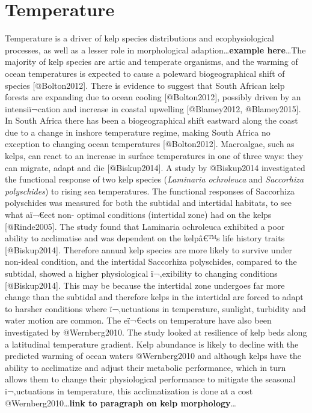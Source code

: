 \documentclass[]{article}
\newcommand{\euro}{€}
\begin{document}
\section{Temperature}\label{temperature}

Temperature is a driver of kelp species distributions and
ecophysiological processes, as well as a lesser role in morphological
adaption\ldots{}\textbf{example here}\ldots{}The majority of kelp
species are artic and temperate organisms, and the warming of ocean
temperatures is expected to cause a poleward biogeographical shift of
species {[}@Bolton2012{]}. There is evidence to suggest that South
African kelp forests are expanding due to ocean cooling
{[}@Bolton2012{]}, possibly driven by an intensiï¬cation and increase
in coastal upwelling {[}@Blamey2012, @Blamey2015{]}. In South Africa
there has been a biogeographical shift eastward along the coast due to a
change in inshore temperature regime, making South Africa no exception
to changing ocean temperatures {[}@Bolton2012{]}. Macroalgae, such as
kelps, can react to an increase in surface temperatures in one of three
ways: they can migrate, adapt and die {[}@Biskup2014{]}. A study by
@Biskup2014 investigated the functional response of two kelp species
(\emph{Laminaria ochroleuca} and \emph{Saccorhiza polyschides}) to
rising sea temperatures. The functional responses of Saccorhiza
polyschides was measured for both the subtidal and intertidal habitats,
to see what aï¬\euro{}ect non- optimal conditions (intertidal zone) had
on the kelps {[}@Rinde2005{]}. The study found that Laminaria ochroleuca
exhibited a poor ability to acclimatise and was dependent on the
kelpâ\euro{}™s life history traits {[}@Biskup2014{]}. Therefore annual
kelp species are more likely to survive under non-ideal condition, and
the intertidal Saccorhiza polyschides, compared to the subtidal, showed
a higher physiological ï¬‚exibility to changing conditions
{[}@Biskup2014{]}. This may be because the intertidal zone undergoes far
more change than the subtidal and therefore kelps in the intertidal are
forced to adapt to harsher conditions where ï¬‚uctuations in
temperature, sunlight, turbidity and water motion are common. The
eï¬\euro{}ects on temperature have also been investigated by
@Wernberg2010. The study looked at resilience of kelp beds along a
latitudinal temperature gradient. Kelp abundance is likely to decline
with the predicted warming of ocean waters @Wernberg2010 and although
kelps have the ability to acclimatize and adjust their metabolic
performance, which in turn allows them to change their physiological
performance to mitigate the seasonal ï¬‚uctuations in temperature, this
acclimatization is done at a cost @Wernberg2010\ldots{}\textbf{link to
paragraph on kelp morphology}\ldots{}
\end{document}
